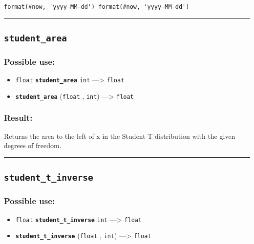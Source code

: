 \documentclass[]{book}
\providecommand{\tightlist}{%
  \setlength{\itemsep}{0pt}\setlength{\parskip}{0pt}}
\theoremstyle{definition}
\theoremstyle{definition}
\theoremstyle{definition}
\theoremstyle{remark}
\begin{document}
\begin{verbatim}
format(#now, 'yyyy-MM-dd') format(#now, 'yyyy-MM-dd') 
\end{verbatim}

\begin{center}\rule{0.5\linewidth}{\linethickness}\end{center}

\subsection{\texorpdfstring{\texttt{student\_area}}{student\_area}}\label{student_area}

\subsubsection{Possible use:}\label{possible-use-506}

\begin{itemize}
\tightlist
\item
  \texttt{float} \textbf{\texttt{student\_area}} \texttt{int}
  ---\textgreater{} \texttt{float}
\item
  \textbf{\texttt{student\_area}} (\texttt{float} , \texttt{int})
  ---\textgreater{} \texttt{float}
\end{itemize}

\subsubsection{Result:}\label{result-489}

Returns the area to the left of x in the Student T distribution with the
given degrees of freedom.

\begin{center}\rule{0.5\linewidth}{\linethickness}\end{center}

\subsection{\texorpdfstring{\texttt{student\_t\_inverse}}{student\_t\_inverse}}\label{student_t_inverse}

\subsubsection{Possible use:}\label{possible-use-507}

\begin{itemize}
\tightlist
\item
  \texttt{float} \textbf{\texttt{student\_t\_inverse}} \texttt{int}
  ---\textgreater{} \texttt{float}
\item
  \textbf{\texttt{student\_t\_inverse}} (\texttt{float} , \texttt{int})
  ---\textgreater{} \texttt{float}
\end{itemize}
\end{document}
